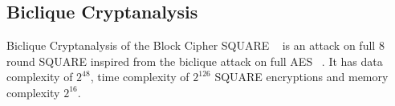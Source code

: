 \documentclass[preprint]{transcrypto}
\begin{document}
\subsection{Biclique Cryptanalysis}
Biclique Cryptanalysis of the Block Cipher SQUARE ~\cite{EPRINT:Mala11} is an attack on full 8 round SQUARE inspired from the biclique attack on full AES ~\cite{AC:BogKhoRec11}. It has data complexity of $2^{48}$, time complexity of $2^{126}$ SQUARE encryptions and memory complexity $2^{16}$.



\end{document}
